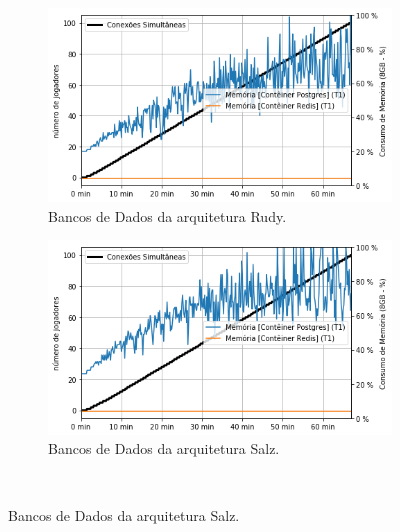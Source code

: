 \vspace{-0.3cm}
\begin{figure}[htb!]
    \caption{Consumo de memória dos bancos de dados.}
    \label{fig:experimento_db_mem}
\vspace{-0.3cm}
    \begin{subfigure}{0.5\textwidth}
        \centering
        \includegraphics[width=.95\linewidth]{figuras/testes/r_mem_db.png}
        \caption{Bancos de Dados da arquitetura Rudy.}
        \label{fig:r_mem_db}
    \end{subfigure}%
    \begin{subfigure}{0.5\textwidth}
        \centering
        \includegraphics[width=.95\linewidth]{figuras/testes/s_mem_db.png}
        \caption{Bancos de Dados da arquitetura Salz.}
        \label{fig:s_mem_db}
    \end{subfigure}\\


\end{figure}
